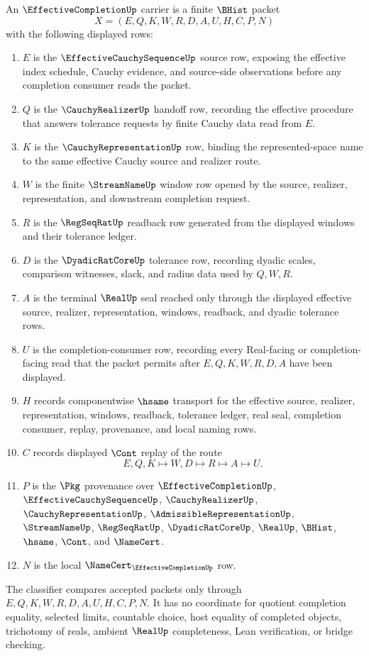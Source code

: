 \begin{definition}
\label{def:effective-completion-carrier}
An $\EffectiveCompletionUp$ carrier is a finite $\BHist$ packet
$$
X=(E,Q,K,W,R,D,A,U,H,C,P,N)
$$
with the following displayed rows:
\begin{enumerate}
\item $E$ is the $\EffectiveCauchySequenceUp$ source row, exposing the effective index schedule, Cauchy evidence, and source-side observations before any completion consumer reads the packet.
\item $Q$ is the $\CauchyRealizerUp$ handoff row, recording the effective procedure that answers tolerance requests by finite Cauchy data read from $E$.
\item $K$ is the $\CauchyRepresentationUp$ row, binding the represented-space name to the same effective Cauchy source and realizer route.
\item $W$ is the finite $\StreamNameUp$ window row opened by the source, realizer, representation, and downstream completion request.
\item $R$ is the $\RegSeqRatUp$ readback row generated from the displayed windows and their tolerance ledger.
\item $D$ is the $\DyadicRatCoreUp$ tolerance row, recording dyadic scales, comparison witnesses, slack, and radius data used by $Q,W,R$.
\item $A$ is the terminal $\RealUp$ seal reached only through the displayed effective source, realizer, representation, windows, readback, and dyadic tolerance rows.
\item $U$ is the completion-consumer row, recording every Real-facing or completion-facing read that the packet permits after $E,Q,K,W,R,D,A$ have been displayed.
\item $H$ records componentwise $\hsame$ transport for the effective source, realizer, representation, windows, readback, tolerance ledger, real seal, completion consumer, replay, provenance, and local naming rows.
\item $C$ records displayed $\Cont$ replay of the route
$$
E,Q,K \longmapsto W,D \longmapsto R \longmapsto A \longmapsto U .
$$
\item $P$ is the $\Pkg$ provenance over $\EffectiveCompletionUp$, $\EffectiveCauchySequenceUp$, $\CauchyRealizerUp$, $\CauchyRepresentationUp$, $\AdmissibleRepresentationUp$, $\StreamNameUp$, $\RegSeqRatUp$, $\DyadicRatCoreUp$, $\RealUp$, $\BHist$, $\hsame$, $\Cont$, and $\NameCert$.
\item $N$ is the local $\NameCert_{\EffectiveCompletionUp}$ row.
\end{enumerate}
The classifier compares accepted packets only through $E,Q,K,W,R,D,A,U,H,C,P,N$. It has no coordinate for quotient completion equality, selected limits, countable choice, host equality of completed objects, trichotomy of reals, ambient $\RealUp$ completeness, Lean verification, or bridge checking.
\end{definition}

